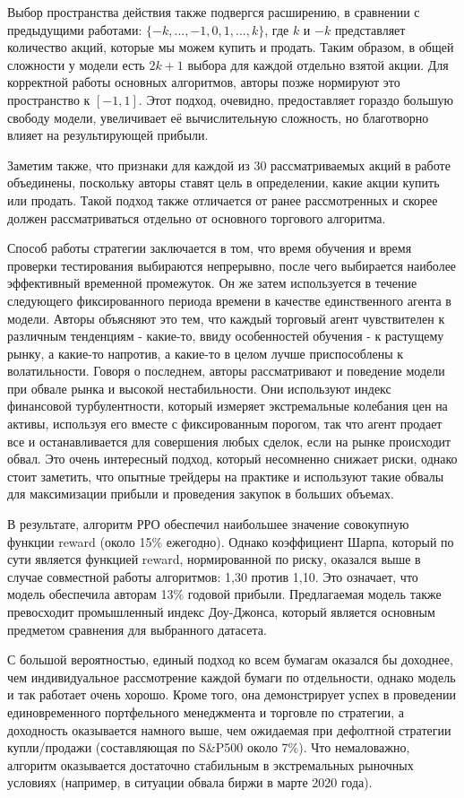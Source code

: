 \documentclass[a4paper,14pt]{extarticle}
\begin{document}
Выбор пространства действия также подвергся расширению, в сравнении с предыдущими работами: $\{−k, ..., −1, 0, 1, ..., k\}$, где $k$ и $-k$ представляет количество акций, которые мы можем купить и продать. Таким образом, в общей сложности у модели есть $2k+1$ выбора для каждой отдельно взятой акции. Для корректной работы основных алгоритмов, авторы позже нормируют это пространство к $[-1, 1]$. Этот подход, очевидно, предоставляет гораздо большую свободу модели, увеличивает её вычислительную сложность, но благотворно влияет на результирующей прибыли.

Заметим также, что признаки для каждой из 30 рассматриваемых акций в работе объединены, поскольку авторы ставят цель в определении, какие акции купить или продать. Такой подход также отличается от ранее рассмотренных и скорее должен рассматриваться отдельно от основного торгового алгоритма.

Способ работы стратегии заключается в том, что время обучения и время проверки тестирования выбираются непрерывно, после чего выбирается наиболее эффективный временной промежуток. Он же затем используется в течение следующего фиксированного периода времени в качестве единственного агента в модели. Авторы объясняют это тем, что каждый торговый агент чувствителен к различным тенденциям - какие-то, ввиду особенностей обучения - к растущему рынку, а какие-то напротив, а какие-то в целом лучше приспособлены к волатильности. Говоря о последнем, авторы рассматривают и поведение модели при обвале рынка и высокой нестабильности. Они используют индекс финансовой турбулентности, который измеряет экстремальные колебания цен на активы, используя его вместе с фиксированным порогом, так что агент продает все и останавливается для совершения любых сделок, если на рынке происходит обвал. Это очень интересный подход, который несомненно снижает риски, однако стоит заметить, что опытные трейдеры на практике и используют такие обвалы для максимизации прибыли и проведения закупок в больших объемах. 

В результате, алгоритм РРО обеспечил наибольшее значение совокупную функции reward (около 15\% ежегодно). Однако коэффициент Шарпа, который по сути является функцией reward, нормированной по риску, оказался выше в случае совместной работы алгоритмов: 1,30 против 1,10. Это означает, что модель обеспечила авторам 13\% годовой прибыли. Предлагаемая модель также превосходит промышленный индекс Доу-Джонса, который является основным предметом сравнения для выбранного датасета.

С большой вероятностью, единый подход ко всем бумагам оказался бы доходнее, чем индивидуальное рассмотрение каждой бумаги по отдельности, однако модель и так работает очень хорошо.  Кроме того, она демонстрирует успех в проведении единовременного портфельного менеджмента и торговле по стратегии, а доходность оказывается намного выше, чем ожидаемая при дефолтной стратегии купли/продажи (составляющая по S\&P500 около 7\%). Что немаловажно, алгоритм оказывается достаточно стабильным в экстремальных рыночных условиях (например, в ситуации обвала биржи в марте 2020 года).
\end{document}
